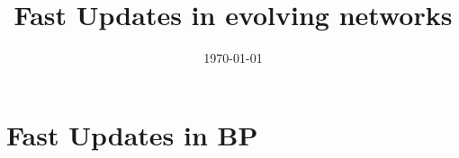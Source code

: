 \documentclass[11pt]{article}
\title{Fast Updates in evolving networks}
\author{}
\date{\today}
\newcommand{\<}{\langle}
\renewcommand{\>}{\rangle}
\begin{document}
\maketitle

\section{Fast Updates in BP}



\end{document}

